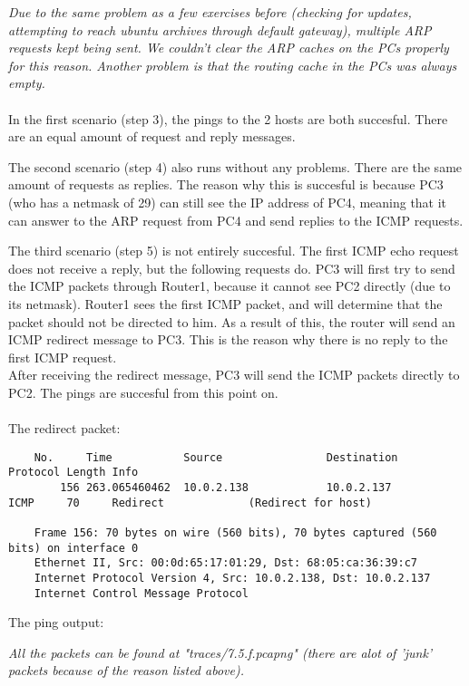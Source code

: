 \textit{Due to the same problem as a few exercises before (checking for updates, attempting to reach ubuntu archives through default gateway), multiple ARP requests kept being sent. We couldn't clear the ARP caches on the PCs properly for this reason. Another problem is that the routing cache in the PCs was always empty.}
\\ \\
In the first scenario (step 3), the pings to the 2 hosts are both succesful. There are an equal amount of request and reply messages.


The second scenario (step 4) also runs without any problems. There are the same amount of requests as replies. The reason why this is succesful is because PC3 (who has a netmask of 29) can still see the IP address of PC4, meaning that it can answer to the ARP request from PC4 and send replies to the ICMP requests.



The third scenario (step 5) is not entirely succesful. The first ICMP echo request does not receive a reply, but the following requests do. PC3 will first try to send the ICMP packets through Router1, because it cannot see PC2 directly (due to its netmask). Router1 sees the first ICMP packet, and will determine that the packet should not be directed to him. As a result of this, the router will send an ICMP redirect message to PC3. This is the reason why there is no reply to the first ICMP request. \\
After receiving the redirect message, PC3 will send the ICMP packets directly to PC2. The pings are succesful from this point on. \\ \\

The redirect packet:
\begin{verbatim}
	No.     Time           Source                Destination           Protocol Length Info
	    156 263.065460462  10.0.2.138            10.0.2.137            ICMP     70     Redirect             (Redirect for host)

	Frame 156: 70 bytes on wire (560 bits), 70 bytes captured (560 bits) on interface 0
	Ethernet II, Src: 00:0d:65:17:01:29, Dst: 68:05:ca:36:39:c7
	Internet Protocol Version 4, Src: 10.0.2.138, Dst: 10.0.2.137
	Internet Control Message Protocol
\end{verbatim}
The ping output:


\textit{All the packets can be found at "traces/7.5.f.pcapng" (there are alot of 'junk' packets because of the reason listed above).}